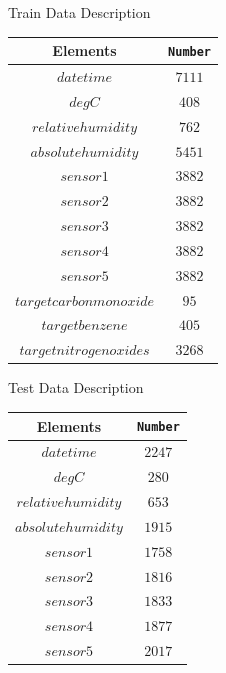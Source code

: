 \documentclass[
 size=14pt,
 paper=smartboard,  %
 mode=present, 		%
 display=slides, 	%
 style=tuliplab,  	%
 pauseslide,
 fleqn,leqno]{powerdot}
\begin{document}
\begin{slide}{Train Data Description}
	\begin{center}
		\begin{tabular}{c| c }
			\toprule
			Elements & \texttt{Number}  \\
			\midrule
			$date time$
			&  {$7111$} \\
			$deg C$
			&  {$408$} \\
			$relative humidity$
			&  {$762$}  \\
			$absolute humidity$
			&  {$5451$}  \\
			$sensor 1$
			&  {$3882$} \\
			$sensor 2$
			&  {$3882$} \\
			$sensor 3$
			&  {$3882$} \\
			$sensor 4$
			&  {$3882$} \\
			$sensor 5$
			&  {$3882$} \\
			$target carbon monoxide$
			&  {$95$} \\
			$target benzene$
			&  {$405$} \\
			$target nitrogen oxides$
			&  {$3268$} \\
			\bottomrule
		\end{tabular}
	\end{center}
\end{slide}

\begin{slide}{Test Data Description}
	\begin{center}
	\begin{tabular}{c| c }
		\toprule
		Elements & \texttt{Number}  \\
		\midrule
		$date time$
		&  {$2247$} \\
		$deg C$
		&  {$280$} \\
		$relative humidity$
		&  {$653$}  \\
		$absolute humidity$
		&  {$1915$}  \\
		$sensor 1$
		&  {$1758$} \\
		$sensor 2$
		&  {$1816$} \\
		$sensor 3$
		&  {$1833$} \\
		$sensor 4$
		&  {$1877$} \\
		$sensor 5$
		&  {$2017$} \\
		\bottomrule
	\end{tabular}
	\end{center}
\end{slide}
\end{document}
